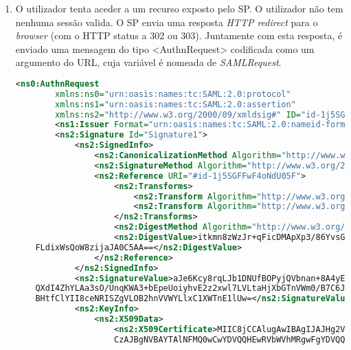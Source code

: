 \begin{enumerate}
    \item O utilizador tenta aceder a um recurso exposto pelo SP. O utilizador não tem nenhuma sessão valida. O SP envia uma resposta \textit{HTTP redirect}  para o \textit{browser} (com o HTTP status a 302 ou 303). Juntamente com esta resposta, é enviado uma mensagem do tipo <AuthnRequest> codificada como um argumento do URL, cuja variável é nomeada de \textit{SAMLRequest}.
    \begin{lstlisting}[language=xml, caption={Exemplo de um <AuthnRequest> enviado pelo SP}, label={lst:AuthnRequest}]
        <ns0:AuthnRequest
        xmlns:ns0="urn:oasis:names:tc:SAML:2.0:protocol"
        xmlns:ns1="urn:oasis:names:tc:SAML:2.0:assertion"
        xmlns:ns2="http://www.w3.org/2000/09/xmldsig#" ID="id-1j5SGFFwF4oNdU05F" Version="2.0" IssueInstant="2021-06-06T04:07:08Z" Destination="http://localhost:8082/sso_redirect" ProtocolBinding="urn:oasis:names:tc:SAML:2.0:bindings:HTTP-POST" AssertionConsumerServiceURL="http://localhost:8081/identity">
        <ns1:Issuer Format="urn:oasis:names:tc:SAML:2.0:nameid-format:entity">http://localhost:8081/sp.xml</ns1:Issuer>
        <ns2:Signature Id="Signature1">
            <ns2:SignedInfo>
                <ns2:CanonicalizationMethod Algorithm="http://www.w3.org/2001/10/xml-exc-c14n#"/>
                <ns2:SignatureMethod Algorithm="http://www.w3.org/2001/04/xmldsig-more#rsa-sha512"/>
                <ns2:Reference URI="#id-1j5SGFFwF4oNdU05F">
                    <ns2:Transforms>
                        <ns2:Transform Algorithm="http://www.w3.org/2000/09/xmldsig#enveloped-signature"/>
                        <ns2:Transform Algorithm="http://www.w3.org/2001/10/xml-exc-c14n#"/>
                    </ns2:Transforms>
                    <ns2:DigestMethod Algorithm="http://www.w3.org/2001/04/xmlenc#sha512"/>
                    <ns2:DigestValue>itkmn8zWzJr+qFicDMApXp3/86YvsG61M/hlR3ec0F7Q//bUJrrS1/nSctRfBrc4
    FLdixWsQoW8zijaJA0C5AA==</ns2:DigestValue>
                </ns2:Reference>
            </ns2:SignedInfo>
            <ns2:SignatureValue>aJe6Kcy8rqLJb1DNUfBOPyjQVbnan+8A4yEkiCCgJZdTKgjf3qrlh/u5WmDTWkRl
    QXdI4ZhYLAa3sO/UnqKWA3+bEpeUoiyhvE2z2xwl7LVLtaHjXbGTnVWm0/B7C6JI
    BHtfClYII8ceNRISZgVLOB2hnVVWYLlxC1XWTnE1lUw=</ns2:SignatureValue>
            <ns2:KeyInfo>
                <ns2:X509Data>
                    <ns2:X509Certificate>MIIC8jCCAlugAwIBAgIJAJHg2V5J31I8MA0GCSqGSIb3DQEBBQUAMFox
                    CzAJBgNVBAYTAlNFMQ0wCwYDVQQHEwRVbWVhMRgwFgYDVQQKEw9VbWVhIFVuaXZlcnNpdHkxEDAOBg

\end{lstlisting}
\end{enumerate}
